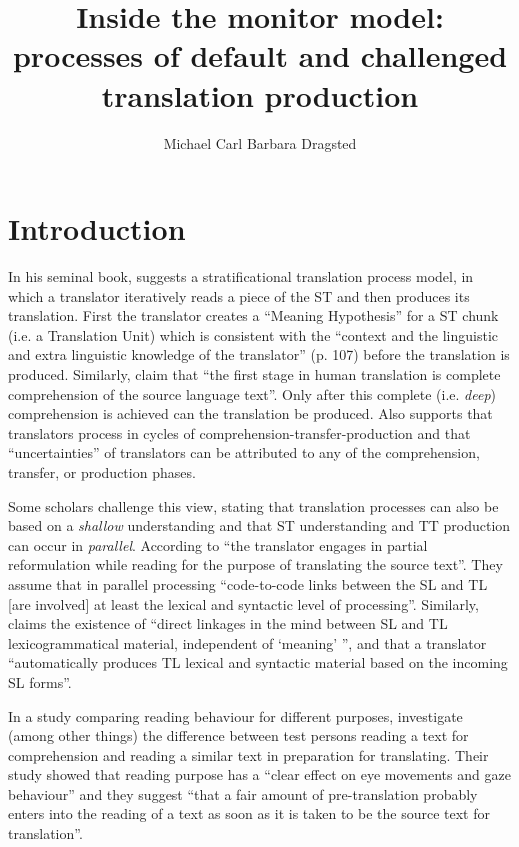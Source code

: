 \documentclass[output=paper]{LSP/langsci}
\author{Michael Carl\lastand 
Barbara Dragsted\affiliation{Copenhagen Business School} 
}
\title{Inside the monitor model: processes of default and challenged translation production}
\begin{document}
 

\section{Introduction}\label{sec:carl:1}

In his seminal book, \citet{Gile1995} suggests a stratificational translation process model, in which a translator iteratively reads a piece of the ST and then produces its translation. First the translator creates a ``Meaning Hypothesis'' for a ST chunk (i.e. a Translation Unit) which is consistent with the ``context and the linguistic and extra linguistic knowledge of the translator'' (p. 107) before the translation is produced. Similarly, \citet{CraciunescuEtAl2004} claim that ``the first stage in human translation is complete comprehension of the source language text''. Only after this complete (i.e. \textit{deep}) comprehension is achieved can the translation be produced. Also \citet{Angelone2010} supports that translators process in cycles of comprehension-transfer-production and that ``uncertainties'' of translators can be attributed to any of the comprehension, transfer, or production phases. 

Some scholars challenge this view, stating that translation processes can also be based on a \textit{shallow} understanding and that ST understanding and TT production can occur in \textit{parallel}. According to \citet{RuizEtAl2008}  ``the translator engages in partial reformulation while reading for the purpose of translating the source text''. They assume that in parallel processing ``code-to-code links between the SL and TL [are involved] at least the lexical and syntactic level of processing''. Similarly, \citet{Mossop2003} claims the existence of ``direct linkages in the mind between SL and TL lexicogrammatical material, independent of `meaning' '', and that a translator ``automatically produces TL lexical and syntactic material based on the incoming SL forms''.

In a study comparing reading behaviour for different purposes, \citet[16]{Jakobsen2008} investigate (among other things) the difference between test persons reading a text for comprehension and reading a similar text in preparation for translating. Their study showed that reading purpose has a ``clear effect on eye movements and gaze behaviour'' and they suggest ``that a fair amount of pre-translation probably enters into the reading of a text as soon as it is taken to be the source text for translation''.
\end{document}
